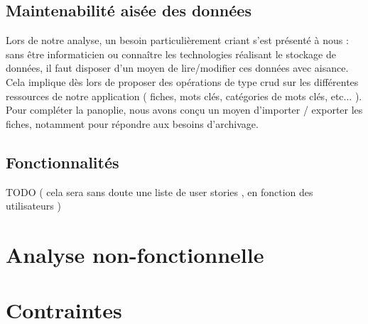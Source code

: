 \subsection*{Maintenabilité aisée des données}

Lors de notre analyse, un besoin particulièrement criant s'est présenté à nous : sans être informaticien ou connaître les technologies réalisant le stockage de données, il faut disposer d'un moyen de lire/modifier ces données avec aisance. \\

Cela implique dès lors de proposer des opérations de type \Gls{crud} sur les différentes ressources de notre application ( fiches, mots clés, catégories de mots clés, etc... ). Pour compléter la panoplie, nous avons conçu un moyen d'importer / exporter les fiches, notamment pour répondre aux besoins d'archivage.

\pagebreak

\subsection*{Fonctionnalités}

TODO ( cela sera sans doute une liste de user stories , en fonction des utilisateurs )





\section{Analyse non-fonctionnelle}

\section {Contraintes}
